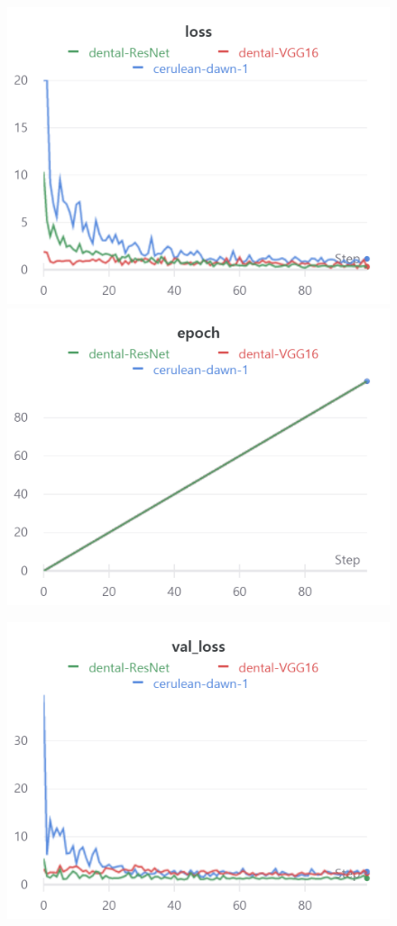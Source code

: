 \documentclass{article}
\begin{document}
\begin{figure}[!htb]
\includegraphics[width=\linewidth]{charts/Section-1-Panel-2-yho4vlz8h}
\caption{}
\endminipage\hfill
{}
\includegraphics[width=\linewidth]{charts/Section-1-Panel-3-5zvvc0iem}
\caption{}
\endminipage
\end{figure}

\begin{figure}[!htb]
\includegraphics[width=\linewidth]{charts/Section-1-Panel-4-xkb7gowyr}
\caption{}
\endminipage
\end{figure}

\nocite{*}


\end{document}
